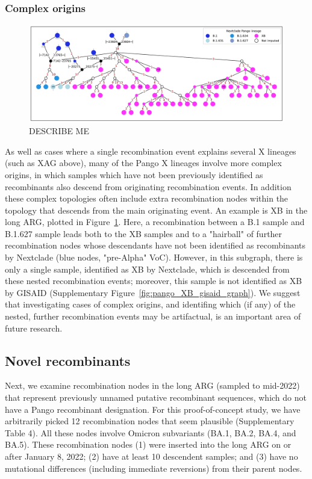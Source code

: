 \documentclass{article}
\begin{document}

\subsubsection{Complex origins}
\begin{figure} \centering
\includegraphics[width=\textwidth]{figures/Pango_XB_nxcld_tight_graph.pdf}
\caption{\label{fig:complex_origins_graph}  DESCRIBE ME}
\end{figure}

As well as cases where a single recombination event explains several X lineages (such as XAG above), many of the Pango X lineages involve more complex origins, in which samples which have not been previously identified as recombinants also descend from originating recombination events. In addition these complex topologies often include extra recombination nodes within the topology that descends from the main originating event. An example is XB in the long ARG, plotted in Figure~\ref{fig:complex_origins_graph}. Here, a recombination between a B.1 sample and B.1.627 sample leads both to the XB samples and to a "hairball" of further recombination nodes whose descendants have not been identified as recombinants by Nextclade (blue nodes, "pre-Alpha" VoC). However, in this subgraph, there is only a single sample, identified as XB by Nextclade, which is descended from these
nested recombination events; moreover, this sample is not identified as XB by GISAID (Supplementary Figure~\ref{fig:pango_XB_gisaid_graph}). We suggest that investigating cases of complex origins, and identifing which (if any) of the nested, further recombination events may be artifactual, is an important area of future research.

\subsection{Novel recombinants}
Next, we examine recombination nodes in the long ARG (sampled to mid-2022) that represent previously unnamed putative recombinant sequences, which do not have a Pango recombinant designation. For this proof-of-concept study, we have arbitrarily picked 12 recombination nodes that seem plausible (Supplementary Table 4). All these nodes involve Omicron subvariants (BA.1, BA.2, BA.4, and BA.5). These recombination nodes (1) were inserted into the long ARG on or after January 8, 2022; (2) have at least 10 descendent samples; and (3) have no mutational differences (including immediate reversions) from their parent nodes.
\end{document}

